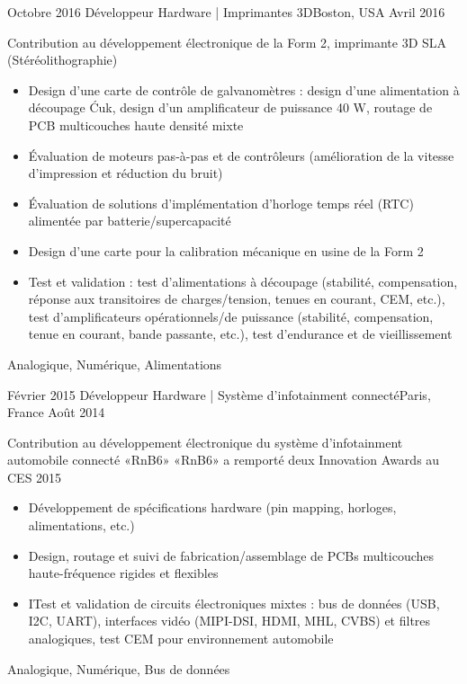 \begin{experiences}
  \experience
    {Octobre 2016}   {Développeur Hardware | Imprimantes 3D}{}{Boston, USA}
    {Avril 2016} {
                      Contribution au développement électronique de la Form 2, imprimante 3D SLA (Stéréolithographie)
                      \begin{itemize}
                        \item Design d’une carte de contrôle de galvanomètres : design d’une alimentation à découpage Ćuk, design d’un amplificateur de puissance 40 W, routage de PCB multicouches haute densité mixte
                        \item Évaluation de moteurs pas-à-pas et de contrôleurs (amélioration de la vitesse d’impression et réduction du bruit)
                        \item Évaluation de solutions d’implémentation d’horloge temps réel (RTC) alimentée par batterie/supercapacité
                        \item Design d’une carte pour la calibration mécanique en usine de la Form 2
                        \item Test et validation : test d’alimentations à découpage (stabilité, compensation, réponse aux transitoires de charges/tension, tenues en courant, CEM, etc.), test d’amplificateurs opérationnels/de puissance (stabilité, compensation, tenue en courant, bande passante, etc.), test d’endurance et de vieillissement
                      \end{itemize}
                    }
                    {Analogique, Numérique, Alimentations}
                    
  \emptySeparator
  
  \experience
    {Février 2015} {Développeur Hardware | Système d'infotainment connecté}{}{Paris, France}
    {Août 2014}    {
                      Contribution au développement électronique du système d’infotainment automobile connecté «RnB6»
                      «RnB6» a remporté deux Innovation Awards au CES 2015
                      \begin{itemize}
                        \item Développement de spécifications hardware (pin mapping, horloges, alimentations, etc.)
                        \item Design, routage et suivi de fabrication/assemblage de PCBs multicouches haute-fréquence rigides et flexibles                        
                        \item ITest et validation de circuits électroniques mixtes : bus de données (USB, I2C, UART), interfaces vidéo (MIPI-DSI, HDMI, MHL, CVBS) et filtres analogiques, test CEM pour environnement automobile
                      \end{itemize}
                    }
                    {Analogique, Numérique, Bus de données}
\end{experiences}
